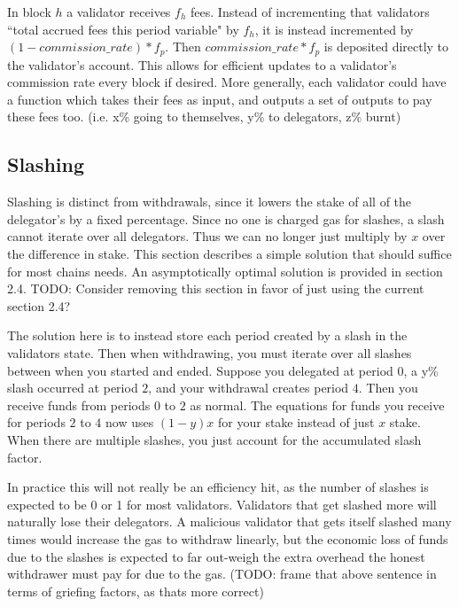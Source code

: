 \documentclass[]{article}
\begin{document}
In block $h$ a validator receives $f_h$ fees.
Instead of incrementing that validators ``total accrued fees this period variable" by $f_h$, it is instead incremented by $(1 - commission\_rate) * f_p$.
Then $commission\_rate * f_p$ is deposited directly to the validator's account.
This allows for efficient updates to a validator's commission rate every block if desired.
More generally, each validator could have a function which takes their fees as input, and outputs a set of outputs to pay these fees too. (i.e. x\% going to themselves, y\% to delegators, z\% burnt)

\subsection{Slashing}
\label{ssec:slashing}
Slashing is distinct from withdrawals, since it lowers the stake of all of the delegator's by a fixed percentage.
Since no one is charged gas for slashes, a slash cannot iterate over all delegators.
Thus we can no longer just multiply by $x$ over the difference in stake.
This section describes a simple solution that should suffice for most chains needs. An asymptotically optimal solution is provided in section 2.4.
TODO: Consider removing this section in favor of just using the current section 2.4?

The solution here is to instead store each period created by a slash in the validators state.
Then when withdrawing, you must iterate over all slashes between when you started and ended.
Suppose you delegated at period $0$, a y\% slash occurred at period $2$, and your withdrawal creates period $4$.
Then you receive funds from periods $0$ to $2$ as normal.
The equations for funds you receive for periods $2$ to $4$ now uses $(1 - y)x$ for your stake instead of just $x$ stake.
When there are multiple slashes, you just account for the accumulated slash factor.

In practice this will not really be an efficiency hit, as the number of slashes is expected to be 0 or 1 for most validators.
Validators that get slashed more will naturally lose their delegators.
A malicious validator that gets itself slashed many times would increase the gas to withdraw linearly, but the economic loss of funds due to the slashes is expected to far out-weigh the extra overhead the honest withdrawer must pay for due to the gas.
(TODO: frame that above sentence in terms of griefing factors, as thats more correct)
\end{document}
